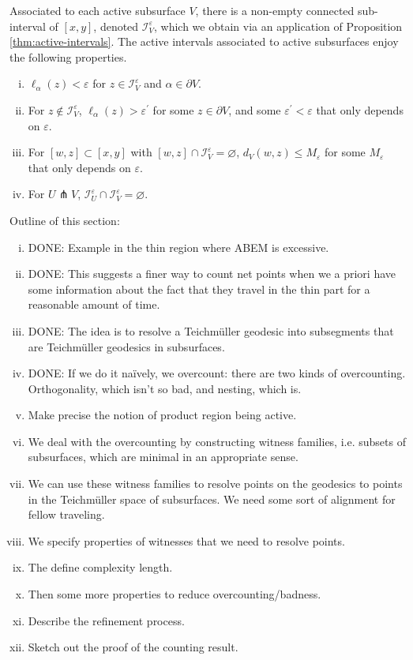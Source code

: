\documentclass[12pt, reqno]{amsart}
\begin{document}
Associated to each active subsurface $V$, there is a non-empty connected sub-interval of $[x,y]$, denoted $\mathcal{I}_V^\varepsilon$, which we obtain via an application of Proposition \ref{thm:active-intervals}.
The active intervals associated to active subsurfaces enjoy the following properties.
\begin{enumerate}[(i)]
\item $\ell_\alpha(z) < \varepsilon$ for $z \in \mathcal{I}_V^\varepsilon$ and $\alpha \in \partial V$.
\item For $z \not \in \mathcal{I}_V^\varepsilon$, $\ell_{\alpha}(z) > \varepsilon^{\prime}$ for some $z \in \partial V$, and some $\varepsilon^{\prime} < \varepsilon$ that only depends on $\varepsilon$.
\item For $[w,z] \subset [x,y]$ with $[w,z] \cap \mathcal{I}_V^\varepsilon = \varnothing$, $d_V(w,z) \leq M_\varepsilon$ for some $M_\varepsilon$ that only depends on $\varepsilon$.
\item For $U \pitchfork V$, $\mathcal{I}_U^\varepsilon \cap \mathcal{I}_V^\varepsilon = \varnothing$.
\end{enumerate}



Outline of this section:
\begin{enumerate}[(i)]
\item {\color{red} DONE:} {Example in the thin region where ABEM is excessive.}
\item {\color{red} DONE:} This suggests a finer way to count net points when we a priori have some information about the fact that they travel in the thin part for a reasonable amount of time.
\item {\color{red} DONE:} The idea is to resolve a Teichmüller geodesic into subsegments that are Teichmüller geodesics in subsurfaces.
\item {\color{red} DONE:} If we do it naïvely, we overcount: there are two kinds of overcounting. Orthogonality, which isn't so bad, and nesting, which is.
\item Make precise the notion of product region being active.
\item We deal with the overcounting by constructing witness families, i.e. subsets of subsurfaces, which are minimal in an appropriate sense.
\item We can use these witness families to resolve points on the geodesics to points in the Teichmüller space of subsurfaces. We need some sort of alignment for fellow traveling.
\item We specify properties of witnesses that we need to resolve points.
\item The define complexity length.
\item Then some more properties to reduce overcounting/badness.
\item Describe the refinement process.
\item Sketch out the proof of the counting result.
\end{enumerate}
\end{document}
